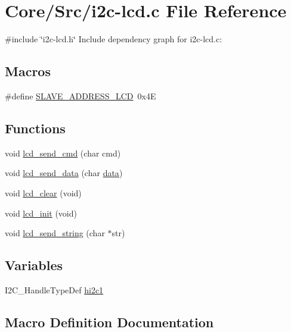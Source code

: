 \hypertarget{i2c-lcd_8c}{}\section{Core/\+Src/i2c-\/lcd.c File Reference}
\label{i2c-lcd_8c}
{\ttfamily \#include \char`\"{}i2c-\/lcd.\+h\char`\"{}}\newline
Include dependency graph for i2c-\/lcd.c\+:
\subsection*{Macros}
\begin{DoxyCompactItemize}
\item 
\#define \hyperlink{i2c-lcd_8c_a16b338f4ba8614530cf7e484066f29c5}{S\+L\+A\+V\+E\+\_\+\+A\+D\+D\+R\+E\+S\+S\+\_\+\+L\+CD}~0x4E
\end{DoxyCompactItemize}
\subsection*{Functions}
\begin{DoxyCompactItemize}
\item 
void \hyperlink{i2c-lcd_8c_a0934da706080d3b0b3b2f04c9d044e67}{lcd\+\_\+send\+\_\+cmd} (char cmd)
\item 
void \hyperlink{i2c-lcd_8c_ac6c9650fc3a35bf393a6bf535e6d0b9f}{lcd\+\_\+send\+\_\+data} (char \hyperlink{main_8c_a7f897df1949af68456ee830f2468e476}{data})
\item 
void \hyperlink{i2c-lcd_8c_ad235a86241458b1e7b8771688bfdaf9a}{lcd\+\_\+clear} (void)
\item 
void \hyperlink{i2c-lcd_8c_a6842775ba83d166f02b8fef8bb63b1e6}{lcd\+\_\+init} (void)
\item 
void \hyperlink{i2c-lcd_8c_a234ae1cb5d91fa756d1216e3540222ad}{lcd\+\_\+send\+\_\+string} (char $\ast$str)
\end{DoxyCompactItemize}
\subsection*{Variables}
\begin{DoxyCompactItemize}
\item 
I2\+C\+\_\+\+Handle\+Type\+Def \hyperlink{i2c-lcd_8c_af7b2c26e44dadaaa798a5c3d82914ba7}{hi2c1}
\end{DoxyCompactItemize}


\subsection{Macro Definition Documentation}
\mbox{\label{i2c-lcd_8c_a16b338f4ba8614530cf7e484066f29c5}} 
